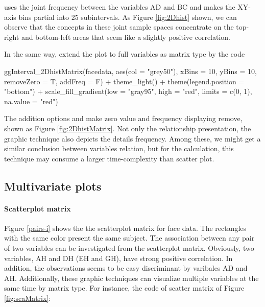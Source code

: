 \documentclass[article]{jss}
\begin{document}
uses the joint frequency between the variables AD and BC and makes the XY-axis bins partial into 25 subintervals. As Figure \ref{fig:2Dhist} shown, we can observe that the concepts in these joint sample spaces concentrate on the top-right and bottom-left areas that seem like a slightly positive correlation.


In the same way, extend the plot to full variables as matrix type by the code
\begin{CodeChunk}
\begin{CodeInput}
ggInterval_2DhistMatrix(facedata, aes(col = "grey50"), xBins = 10,
                        yBins = 10, removeZero = T, addFreq = F) +
  theme_light() + 
  theme(legend.position = "bottom") + 
  scale_fill_gradient(low = "gray95",
                      high = "red",
                      limits = c(0, 1),
                      na.value = "red") 
\end{CodeInput}
\end{CodeChunk}
The addition options  and  make zero value and frequency displaying remove, shown as Figure \ref{fig:2DhistMatrix}. Not only the relationship presentation, the graphic technique also depicts the details frequency. Among these, we might get a similar conclusion between variables relation, but for the calculation, this technique may consume a larger time-complexity than scatter plot.









\subsection{Multivariate plots}



\paragraph{Scatterplot matrix}
Figure \ref{pairs-i} shows
the the scatterplot matrix for face data. The rectangles with
the same color present the same subject. The association between any pair
of two variables can be investigated from the scatterplot
matrix. Obviously, two variables, AH and DH (EH and GH),
have strong positive correlation. In addition, the observations seems to
be easy discriminant by varibales AD and AH.
Additionally, these graphic techniques can visualize multiple variables at the same time by matrix type. For instance, the code of scatter matrix of Figure \ref{fig:scaMatrix}:
\end{document}
